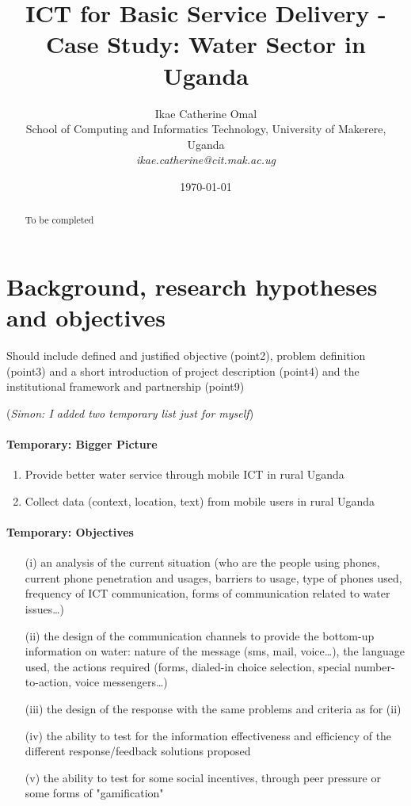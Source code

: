 \documentclass[11pt]{article}
\title{ICT for Basic Service Delivery - Case Study: Water Sector in Uganda}
\author{
\small{Ikae Catherine Omal}\\
\small{School of Computing and Informatics Technology, University of Makerere, Uganda}\\ \small{\textit{ikae.catherine@cit.mak.ac.ug}}\\
}
\date{\today}
\newcommand{\simon}[1]{\vspace{1em}(\emph{Simon: #1})\vspace{1em}}
\begin{document}
\maketitle

\begin{abstract}
To be completed
\end{abstract}



\section{Background, research hypotheses and objectives}\label{background}
Should include defined and justified objective (point2), problem definition (point3) and a short introduction of project description (point4) and the institutional framework and partnership (point9)

\simon{I added two temporary list just for myself}

\paragraph{Temporary: Bigger Picture}
\begin{enumerate}
 \item Provide better water service through mobile ICT in rural Uganda
 \item Collect data (context, location, text) from mobile users in rural Uganda
\end{enumerate}


\paragraph{Temporary: Objectives}
\begin{itemize}
\item[(i)] an analysis of the current situation (who are the people using phones, current phone penetration and usages, barriers to usage, type of phones used, frequency of ICT communication, forms of communication related to water issues…)
\item[(ii)] the design of the communication channels to provide the bottom-up information on water: nature of the message (sms, mail, voice…), the language used, the actions required (forms, dialed-in choice selection, special number-to-action, voice messengers…)
\item[(iii)] the design of the response with the same problems and criteria as for (ii)
\item[(iv)] the ability to test for the information effectiveness and efficiency of the different response/feedback solutions proposed
\item[(v)] the ability to test for some social incentives, through peer pressure or some forms of "gamification"
\end{itemize}
\end{document}
